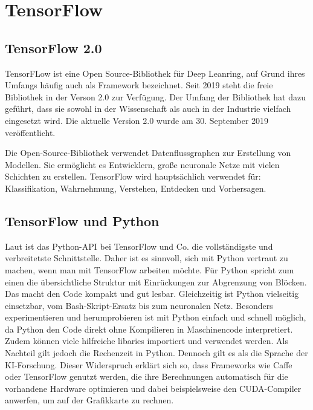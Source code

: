 %
%
%




    
\chapter{TensorFlow} \label{Kapitel_TF}

\section{TensorFlow 2.0} 
 
 TensorFLow ist eine Open Source-Bibliothek für Deep Leanring, auf Grund ihres Umfangs häufig auch als Framework bezeichnet.
Seit 2019 steht die freie Bibliothek in der Verson 2.0 zur Verfügung. Der Umfang der Bibliothek hat dazu geführt, 
dass sie sowohl in der Wissenschaft als auch in der Industrie vielfach eingesetzt wird. Die aktuelle Version 2.0 wurde am 30. September 2019 veröffentlicht.
 \cite{TensorFlow.02.12.2020}

Die Open-Source-Bibliothek verwendet Datenflussgraphen zur Erstellung von Modellen. 
Sie ermöglicht es Entwicklern, große neuronale Netze mit vielen Schichten zu erstellen. TensorFlow wird hauptsächlich verwendet für: Klassifikation, Wahrnehmung, Verstehen, Entdecken und Vorhersagen. \cite{GoogleTensorFlow:2019} %

\section{TensorFlow und Python}
Laut \cite{Heise:2020} ist das Python-API bei TensorFlow und Co. die vollständigste und verbreitetste Schnittstelle. Daher ist es sinnvoll, sich mit Python vertraut zu machen, wenn man mit TensorFlow arbeiten möchte.
Für Python spricht zum einen die übersichtliche Struktur mit Einrückungen zur Abgrenzung von Blöcken. Das macht den Code kompakt und gut lesbar. Gleichzeitig ist Python vielseitig einsetzbar, vom Bash-Skript-Ersatz bis zum neuronalen Netz. Besonders experimentieren und herumprobieren ist mit Python einfach und schnell möglich, da Python den Code direkt ohne Kompilieren in Maschinencode interpretiert. Zudem können viele hilfreiche libaries importiert und verwendet werden.
Als Nachteil gilt jedoch die Rechenzeit in Python. Dennoch gilt es als die Sprache der KI-Forschung. Dieser Widerspruch erklärt sich so, dass Frameworks wie Caffe oder TensorFlow genutzt werden, die \glqq ihre Berechnungen automatisch für
die vorhandene Hardware optimieren und dabei
beispielsweise den CUDA-Compiler anwerfen, um
auf der Grafikkarte zu rechnen.\grqq \cite{Heise:2020}

